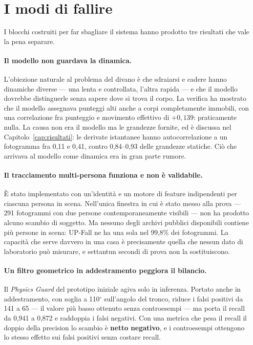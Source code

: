 \section{I modi di fallire}
\label{sec:modi-fallire}

I blocchi costruiti per far sbagliare il sistema hanno prodotto tre risultati che vale la pena separare.

\paragraph{Il modello non guardava la dinamica.} L'obiezione naturale al problema del divano è che sdraiarsi e cadere hanno dinamiche diverse --- una lenta e controllata, l'altra rapida --- e che il modello dovrebbe distinguerle senza sapere dove si trova il corpo. La verifica ha mostrato che il modello assegnava punteggi alti anche a corpi completamente immobili, con una correlazione fra punteggio e movimento effettivo di $+0{,}139$: praticamente nulla. La causa non era il modello ma le grandezze fornite, ed è discussa nel Capitolo~\ref{cap:risultati}: le derivate istantanee hanno autocorrelazione a un fotogramma fra 0,11 e 0,41, contro 0,84--0,93 delle grandezze statiche. Ciò che arrivava al modello come dinamica era in gran parte rumore.

\paragraph{Il tracciamento multi-persona funziona e non è validabile.} È stato implementato con un'identità e un motore di feature indipendenti per ciascuna persona in scena. Nell'unica finestra in cui è stato messo alla prova --- 291 fotogrammi con due persone contemporaneamente visibili --- non ha prodotto alcuno scambio di soggetto. Ma nessuno degli archivi pubblici disponibili contiene più persone in scena: UP-Fall ne ha una sola nel 99,8\% dei fotogrammi. La capacità che serve davvero in una casa è precisamente quella che nessun dato di laboratorio può misurare, e settantun secondi di prova non la sostituiscono.

\paragraph{Un filtro geometrico in addestramento peggiora il bilancio.} Il \emph{Physics Guard} del prototipo iniziale agiva solo in inferenza. Portato anche in addestramento, con soglia a 110$^\circ$ sull'angolo del tronco, riduce i falsi positivi da 141 a 65 --- il valore più basso ottenuto senza controesempi --- ma porta il recall da 0,941 a 0,872 e raddoppia i falsi negativi. Con una metrica che pesa il recall il doppio della precision lo scambio è \textbf{netto negativo}, e i controesempi ottengono lo stesso effetto sui falsi positivi senza costare recall.


